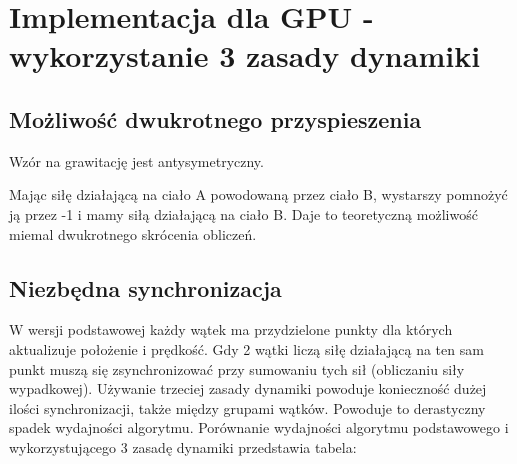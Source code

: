 
\section { Implementacja dla GPU - wykorzystanie 3 zasady dynamiki }
\subsection {Możliwość dwukrotnego przyspieszenia}

Wzór na grawitację jest antysymetryczny.

Mając siłę działającą na ciało A powodowaną przez ciało B, wystarszy pomnożyć ją przez -1 i mamy siłą działającą na ciało B. Daje to teoretyczną możliwość miemal dwukrotnego skrócenia obliczeń.

\subsection {Niezbędna synchronizacja}
W wersji podstawowej każdy wątek ma przydzielone punkty dla których aktualizuje położenie i prędkość. Gdy 2 wątki liczą siłę działającą na ten sam punkt muszą się zsynchronizować przy sumowaniu tych sił (obliczaniu siły wypadkowej). Używanie trzeciej zasady dynamiki powoduje konieczność dużej ilości synchronizacji, także między grupami wątków. Powoduje to derastyczny spadek wydajności algorytmu.
Porównanie wydajności algorytmu podstawowego i wykorzystującego 3 zasadę dynamiki przedstawia tabela:
